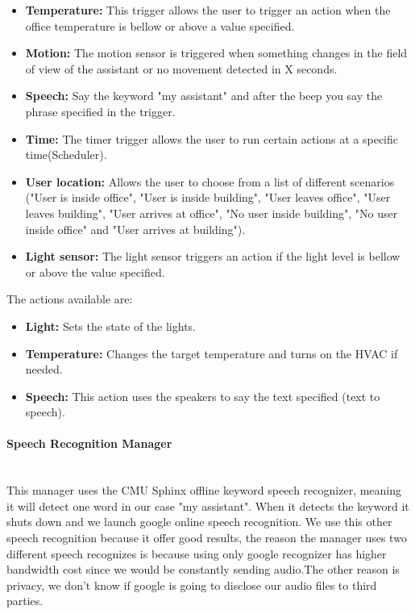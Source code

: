 \begin{itemize}
  \item \textbf{Temperature:} This trigger allows the user to trigger an action when the office temperature is bellow or above a value specified.
  \item \textbf{Motion:} The motion sensor is triggered when something changes in the field of view of the assistant or no movement detected in X seconds.
  \item \textbf{Speech:} Say the keyword "my assistant" and after the beep you say the phrase specified in the trigger.  
  \item \textbf{Time:} The timer trigger allows the user to run certain actions at a specific time(Scheduler).  
  \item \textbf{User location:} Allows the user to choose from a list of different scenarios ("User is inside office", "User is inside building", "User leaves office", "User leaves building", "User arrives at office", "No user inside building", "No user inside office" and "User arrives at building").
  \item \textbf{Light sensor:} The light sensor triggers an action if the light level is bellow or above the value specified.
  
\end{itemize}

The actions available are:

\begin{itemize}
  \item \textbf{Light:} Sets the state of the lights.
  \item \textbf{Temperature:} Changes the target temperature and turns on the HVAC if needed.
  \item \textbf{Speech:} This action uses the speakers to say the text specified (text to speech).
\end{itemize}


\paragraph{Speech Recognition Manager}\mbox{}\\

This manager uses the CMU Sphinx offline keyword speech recognizer, meaning it will detect one word in our case "my assistant". When it detects the keyword it shuts down and we launch google online speech recognition. We use this other speech recognition because it offer good results, the reason the manager uses two different speech recognizes is because using only google recognizer has higher bandwidth cost since we would be constantly sending audio.The other reason is privacy, we don't know if google is going to disclose our audio files to third parties.

